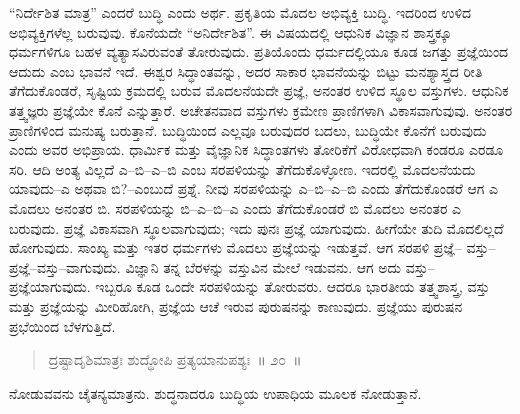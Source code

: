 “ನಿರ್ದೇಶಿತ ಮಾತ್ರ” ಎಂದರೆ ಬುದ್ಧಿ ಎಂದು ಅರ್ಥ. ಪ್ರಕೃತಿಯ ಮೊದಲ ಅಭಿವ್ಯಕ್ತಿ ಬುದ್ಧಿ. ಇದರಿಂದ ಉಳಿದ ಅಭಿವ್ಯಕ್ತಿಗಳೆಲ್ಲ ಬರುವುವು. ಕೊನೆಯದೇ “ಅನಿರ್ದೇಶಿತ”. ಈ ವಿಷಯದಲ್ಲಿ ಆಧುನಿಕ ವಿಜ್ಞಾನ ಶಾಸ್ತ್ರಕ್ಕೂ ಧರ್ಮಗಳಿಗೂ ಬಹಳ ವ್ಯತ್ಯಾಸವಿರುವಂತೆ ತೋರುವುದು. ಪ್ರತಿಯೊಂದು ಧರ್ಮದಲ್ಲಿಯೂ ಕೂಡ ಜಗತ್ತು ಪ್ರಜ್ಞೆಯಿಂದ ಆದುದು ಎಂಬ ಭಾವನೆ ಇದೆ. ಈಶ್ವರ ಸಿದ್ಧಾಂತವನ್ನು, ಅದರ ಸಾಕಾರ ಭಾವನೆಯನ್ನು ಬಿಟ್ಟು ಮನಶ್ಯಾಸ್ತ್ರದ ರೀತಿ ತೆಗೆದುಕೊಂಡರೆ, ಸೃಷ್ಟಿಯ ಕ್ರಮದಲ್ಲಿ ಬರುವ ಮೊದಲನೆಯದೇ ಪ್ರಜ್ಞೆ, ಅನಂತರ ಉಳಿದ ಸ್ಥೂಲ ವಸ್ತುಗಳು. ಆಧುನಿಕ ತತ್ತ್ವಜ್ಞರು ಪ್ರಜ್ಞೆಯೇ ಕೊನೆ ಎನ್ನುತ್ತಾರೆ. ಅಚೇತನವಾದ ವಸ್ತುಗಳು ಕ್ರಮೇಣ ಪ್ರಾಣಿಗಳಾಗಿ ವಿಕಾಸವಾಗುವುವು. ಅನಂತರ ಪ್ರಾಣಿಗಳಿಂದ ಮನುಷ್ಯ ಬರುತ್ತಾನೆ. ಬುದ್ಧಿಯಿಂದ ಎಲ್ಲವೂ ಬರುವುದರ ಬದಲು, ಬುದ್ಧಿಯೇ ಕೊನೆಗೆ ಬರುವುದು ಎಂದು ಅವರ ಅಭಿಪ್ರಾಯ. ಧಾರ್ಮಿಕ ಮತ್ತು ವೈಜ್ಞಾನಿಕ ಸಿದ್ಧಾಂತಗಳು ತೋರಿಕೆಗೆ ವಿರೋಧವಾಗಿ ಕಂಡರೂ ಎರಡೂ ಸರಿ. ಆದಿ ಅಂತ್ಯ ವಿಲ್ಲದೆ ಎ–ಬಿ–ಎ–ಬಿ ಎಂಬ ಸರಪಳಿಯನ್ನು ತೆಗೆದುಕೊಳ್ಳೋಣ. ಇದರಲ್ಲಿ ಮೊದಲನೆಯದು ಯಾವುದು–ಎ ಅಥವಾ ಬಿ?–ಎಂಬುದೆ ಪ್ರಶ್ನೆ. ನೀವು ಸರಪಳಿಯನ್ನು ಎ–ಬಿ–ಎ–ಬಿ ಎಂದು ತೆಗೆದುಕೊಂಡರೆ ಆಗ ಎ ಮೊದಲು ಅನಂತರ ಬಿ. ಸರಪಳಿಯನ್ನು ಬಿ–ಎ–ಬಿ–ಎ ಎಂದು ತೆಗೆದುಕೊಂಡರೆ ಬಿ ಮೊದಲು ಅನಂತರ ಎ ಬರುವುದು. ಪ್ರಜ್ಞೆ ವಿಕಾಸವಾಗಿ ಸ್ಥೂಲವಾಗುವುದು; ಇದು ಪುನಃ ಪ್ರಜ್ಞೆ ಯಾಗುವುದು. ಹೀಗೆಯೇ ತುದಿ ಮೊದಲಿಲ್ಲದೆ ಹೋಗುವುದು. ಸಾಂಖ್ಯ ಮತ್ತು ಇತರ ಧರ್ಮಗಳು ಮೊದಲು ಪ್ರಜ್ಞೆಯನ್ನು ಇಡುತ್ತವೆ. ಆಗ ಸರಪಳಿ ಪ್ರಜ್ಞೆ– ವಸ್ತು–ಪ್ರಜ್ಞೆ–ವಸ್ತು–ವಾಗುವುದು. ವಿಜ್ಞಾನಿ ತನ್ನ ಬೆರಳನ್ನು ವಸ್ತುವಿನ ಮೇಲೆ ಇಡುವನು. ಆಗ ಅದು ವಸ್ತು–ಪ್ರಜ್ಞೆಯಾಗುವುದು. ಇಬ್ಬರೂ ಕೂಡ ಒಂದೇ ಸರಪಳಿಯನ್ನು ತೋರುವರು. ಆದರೂ ಭಾರತೀಯ ತತ್ತ್ವಶಾಸ್ತ್ರ, ವಸ್ತು ಮತ್ತು ಪ್ರಜ್ಞೆಯನ್ನು ಮೀರಿಹೋಗಿ, ಪ್ರಜ್ಞೆಯ ಆಚೆ ಇರುವ ಪುರುಷನನ್ನು ಕಾಣುವುದು. ಪ್ರಜ್ಞೆಯು ಪುರುಷನ ಪ್ರಭೆಯಿಂದ ಬೆಳಗುತ್ತಿದೆ. 


\begin{verse}
ದ್ರಷ್ಟಾದೃಶಿಮಾತ್ರಃ ಶುದ್ಧೋಪಿ ಪ್ರತ್ಯಯಾನುಪಶ್ಯಃ~॥ ೨೦~॥
\end{verse}


ನೋಡುವವನು ಚೈತನ್ಯಮಾತ್ರನು. ಶುದ್ಧನಾದರೂ ಬುದ್ಧಿಯ ಉಪಾಧಿಯ ಮೂಲಕ ನೋಡುತ್ತಾನೆ. 

